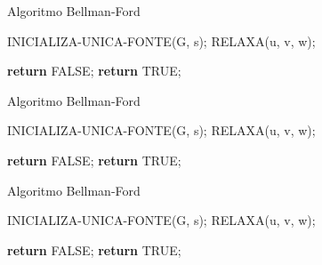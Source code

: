 \documentclass[aspectratio=169]{beamer}
\begin{document}
	\begin{frame}{Algoritmo Bellman-Ford}
		\begin{algorithm}[H]
			\caption{Bellman-Ford}\label{alg:d}
			\begin{algorithmic}[1]
				\State INICIALIZA-UNICA-FONTE(G, s);
				   
				\State RELAXA(u, v, w);   
				\EndFor
				\EndFor
				
				\State \textbf{return} FALSE;
				\EndIf
				\EndFor
				\State \textbf{return} TRUE;
				\EndProcedure
			\end{algorithmic}
		\end{algorithm}
	\end{frame}
	
	\begin{frame}{Algoritmo Bellman-Ford}
		\begin{algorithm}[H]
			\caption{Bellman-Ford}\label{alg:d}
			\begin{algorithmic}[1]
				\State INICIALIZA-UNICA-FONTE(G, s);
				   
				   
				\State RELAXA(u, v, w);   
				\EndFor
				\EndFor
				
				\State \textbf{return} FALSE;
				\EndIf
				\EndFor
				\State \textbf{return} TRUE;
				\EndProcedure
			\end{algorithmic}
		\end{algorithm}
	\end{frame}
	
	\begin{frame}{Algoritmo Bellman-Ford}
		\begin{algorithm}[H]
			\caption{Bellman-Ford}\label{alg:d}
			\begin{algorithmic}[1]
				\State INICIALIZA-UNICA-FONTE(G, s);
				   
				   
				\State RELAXA(u, v, w);   
				\EndFor
				\EndFor
				
				\State \textbf{return} FALSE;
				\EndIf
				\EndFor
				\State \textbf{return} TRUE;
				\EndProcedure
			\end{algorithmic}
		\end{algorithm}
	\end{frame}
	
\end{document}
